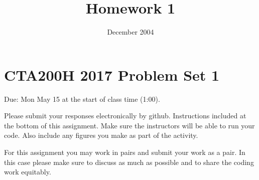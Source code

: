 \documentclass[]{article}
\begin{document}
\title{Homework 1}
\author{}
\date{December 2004}



\section*{CTA200H 2017 Problem Set 1}

Due: Mon May 15 at the start of class time (1:00).

Please submit your responses electronically by github. Instructions included at the bottom of this assignment.  Make sure the instructors will be able to run your code.  Also include any figures you make as part of the activity.

For this assignment you may work in pairs and submit your work as a pair.  In this case please make sure to discuss as much as possible and to share the coding work equitably.
\end{document}
